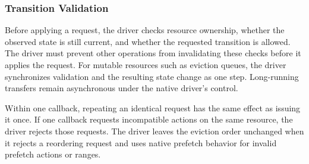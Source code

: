 \subsubsection{Transition Validation}

Before applying a request, the driver checks resource ownership, whether the observed state is still current, and whether the requested transition is allowed.
The driver must prevent other operations from invalidating these checks before it applies the request.
For mutable resources such as eviction queues, the driver synchronizes validation and the resulting state change as one step.
Long-running transfers remain asynchronous under the native driver's control.

Within one callback, repeating an identical request has the same effect as issuing it once.
If one callback requests incompatible actions on the same resource, the driver rejects those requests.
The driver leaves the eviction order unchanged when it rejects a reordering request and uses native prefetch behavior for invalid prefetch actions or ranges.


